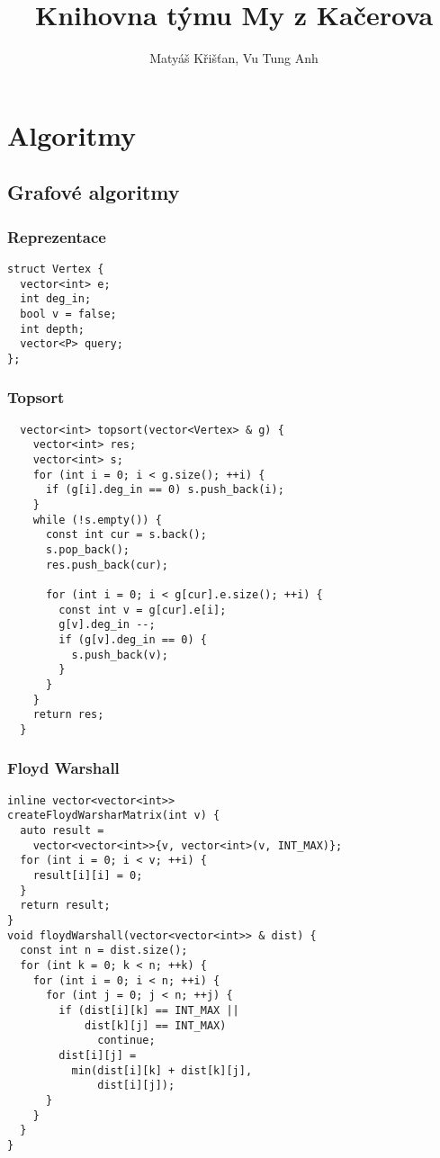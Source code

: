 \documentclass{article}
\title{Knihovna týmu My z Kačerova}
\author{Matyáš Křišťan, Vu Tung Anh}
\begin{document}
\tableofcontents

\section{Algoritmy}
\subsection{Grafové algoritmy}
\subsubsection{Reprezentace}
\begin{lstlisting}
struct Vertex {
  vector<int> e;
  int deg_in;
  bool v = false;
  int depth;
  vector<P> query;
};
\end{lstlisting}

\subsubsection{Topsort}
\begin{lstlisting}
  vector<int> topsort(vector<Vertex> & g) {
    vector<int> res;
    vector<int> s;
    for (int i = 0; i < g.size(); ++i) {
      if (g[i].deg_in == 0) s.push_back(i);
    }
    while (!s.empty()) {
      const int cur = s.back();
      s.pop_back();
      res.push_back(cur);

      for (int i = 0; i < g[cur].e.size(); ++i) {
        const int v = g[cur].e[i];
        g[v].deg_in --;
        if (g[v].deg_in == 0) {
          s.push_back(v);
        }
      }
    }
    return res;
  }
\end{lstlisting}

\subsubsection{Floyd Warshall}
\begin{lstlisting}
inline vector<vector<int>> 
createFloydWarsharMatrix(int v) {
  auto result = 
    vector<vector<int>>{v, vector<int>(v, INT_MAX)};
  for (int i = 0; i < v; ++i) {
    result[i][i] = 0;
  }
  return result;
}
void floydWarshall(vector<vector<int>> & dist) {
  const int n = dist.size();
  for (int k = 0; k < n; ++k) {
    for (int i = 0; i < n; ++i) {
      for (int j = 0; j < n; ++j) {
        if (dist[i][k] == INT_MAX || 
            dist[k][j] == INT_MAX) 
              continue;
        dist[i][j] = 
          min(dist[i][k] + dist[k][j], 
              dist[i][j]);
      }
    }
  }
}
\end{lstlisting}
\end{document}
